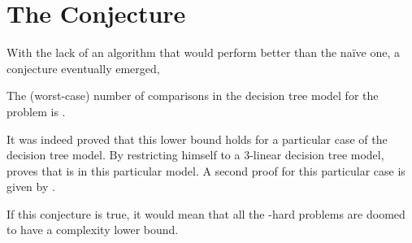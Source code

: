 \section{The Conjecture}

With the lack of an algorithm that would perform better than the naïve
 one, a conjecture eventually emerged,

\begin{conjecture}
The (worst-case) number of comparisons in the decision tree model for the
\threeSUM problem is .
\end{conjecture}

It was indeed proved that this lower bound holds for a particular case of the
decision tree model. By restricting himself to a $3$-linear decision tree
model, \citet{erickson:1999} proves that \threeSUM is  in this
particular model. A second proof for this particular case is given by
\citet{ailon:2005}.

If this conjecture is true, it would mean that all the \threeSUM-hard
problems are doomed to have a  complexity lower bound.
